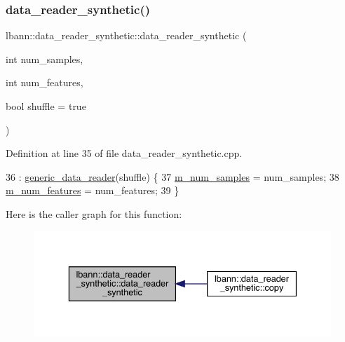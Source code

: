 \subsubsection{\texorpdfstring{data\+\_\+reader\+\_\+synthetic()}{data\_reader\_synthetic()}\hspace{0.1cm}{\footnotesize\ttfamily [1/2]}}
{\footnotesize\ttfamily lbann\+::data\+\_\+reader\+\_\+synthetic\+::data\+\_\+reader\+\_\+synthetic (\begin{DoxyParamCaption}\item[{int}]{num\+\_\+samples,  }\item[{int}]{num\+\_\+features,  }\item[{bool}]{shuffle = {\ttfamily true} }\end{DoxyParamCaption})}



Definition at line 35 of file data\+\_\+reader\+\_\+synthetic.\+cpp.


\begin{DoxyCode}
36   : \hyperlink{classlbann_1_1generic__data__reader_aaba933b8f7c1227801f6e80d39986af4}{generic\_data\_reader}(shuffle) \{
37   \hyperlink{classlbann_1_1data__reader__synthetic_aa71d4bc62be7cf93eb6e85abf82d6b1f}{m\_num\_samples} = num\_samples;
38   \hyperlink{classlbann_1_1data__reader__synthetic_a18f0ba6014a0f1edec24c7c3c109c520}{m\_num\_features} = num\_features;
39 \}
\end{DoxyCode}
Here is the caller graph for this function\+:\nopagebreak
\begin{figure}[H]
\begin{center}
\leavevmode
\includegraphics[width=336pt]{classlbann_1_1data__reader__synthetic_a9d1cf28b223c11e4fdc776b0d364685d_icgraph}
\end{center}
\end{figure}
\mbox{\label{classlbann_1_1data__reader__synthetic_a5c6af71af9357bb7b877f1a04600824a}} 
